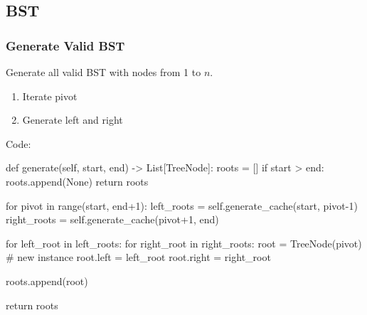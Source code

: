 \subsection{BST}
\subsubsection{Generate Valid BST}
Generate all valid BST with nodes from 1 to $n$.
\begin{enumerate}
\item Iterate pivot
\item Generate left and right
\end{enumerate}
Code:
\begin{python}
def generate(self, start, end) -> List[TreeNode]:
  roots = []
  if start > end:
    roots.append(None)
    return roots

  for pivot in range(start, end+1):
    left_roots = self.generate_cache(start, pivot-1)
    right_roots = self.generate_cache(pivot+1, end)
    
    for left_root in left_roots:
      for right_root in right_roots:
        root = TreeNode(pivot)  # new instance
        root.left = left_root
        root.right = right_root

        roots.append(root)

  return roots 

\end{python}


